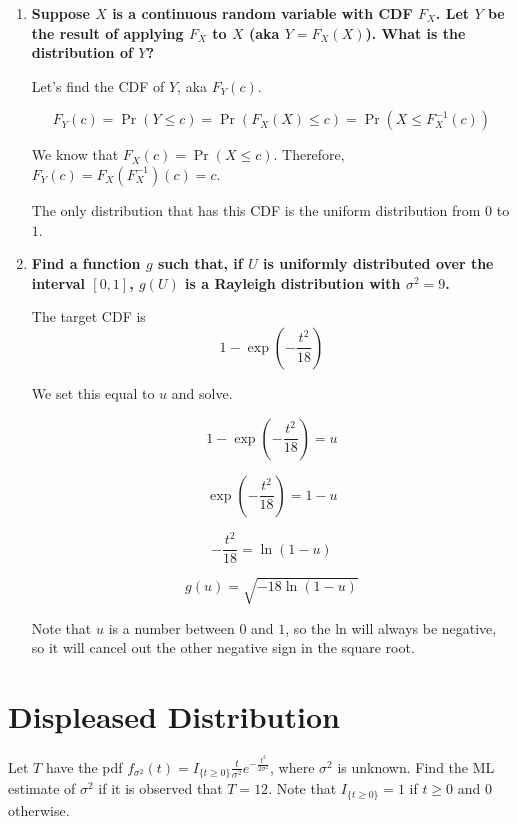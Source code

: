 \documentclass{article}
\begin{document}
\begin{enumerate}[label=(\alph*)]
    \item \textbf{Suppose $X$ is a continuous random variable with CDF $F_X$. Let $Y$ be the result of applying $F_X$ to $X$ (aka $Y = F_X(X)$). What is the distribution of $Y$?}
    
    Let's find the CDF of $Y$, aka $F_Y(c)$.
    
    $$F_Y(c) = \Pr(Y \leq c) = \Pr(F_X(X) \leq c) = \Pr(X \leq F_X^{-1}(c))$$
    
    We know that $F_X(c) = \Pr(X \leq c)$. Therefore, $F_Y(c) = F_X(F_X^{-1})(c) = c$.
    
    The only distribution that has this CDF is the uniform distribution from $0$ to $1$.

    \vspace{2cm}
    
    \item \textbf{Find a function $g$ such that, if $U$ is uniformly distributed over the interval $[0, 1]$, $g(U)$ is a Rayleigh distribution with $\sigma^2 = 9$.}
    
    The target CDF is $$1 - \exp\left(-\frac{t^2}{18}\right)$$
    
    We set this equal to $u$ and solve.
    
    $$1 - \exp\left(-\frac{t^2}{18} \right) = u$$
    
    $$\exp\left(-\frac{t^2}{18} \right) = 1 - u$$
    
    $$-\frac{t^2}{18} = \ln(1 - u)$$
    
    $$\boxed{g(u) = \sqrt{-18\ln(1 - u)}}$$
    
    Note that $u$ is a number between $0$ and $1$, so the ln will always be negative, so it will cancel out the other negative sign in the square root.
    
\end{enumerate}

\newpage

\section{Displeased Distribution}

Let $T$ have the pdf $f_{\sigma^2}(t) = I_{\{t \geq 0\}} \frac{t}{\sigma^2} e^{-\frac{t^2}{2 \sigma^2}}$, where $\sigma^2$ is unknown. Find the ML estimate of $\sigma^2$ if it is observed that $T = 12$. Note that $I_{\{t \geq 0\}} = 1$ if $t \geq 0$ and $0$ otherwise.
\end{document}
